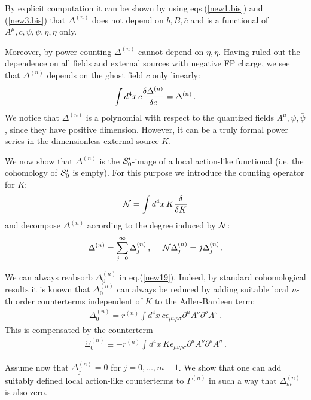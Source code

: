 \documentclass[a4paper,11pt]{article}
\def\G{\Gamma}
\begin{document}
By explicit computation it can be shown by using eqs.(\ref{new1.bis}) and
(\ref{new3.bis}) that $\Delta^{(n)}$ does not depend on $b,B,\bar c$ and
is a functional of $A^\mu,c,\bar \psi, \psi, \eta, \bar \eta$
only.

Moreover, by power counting $\Delta^{(n)}$ cannot depend on $\eta, \bar \eta$.
Having ruled out the dependence on all fields and external sources
with negative FP charge, we see that $\Delta^{(n)}$ depends on the
ghost field $c$ only linearly:
%
\begin{eqnarray}
\int d^4x \, c {\delta \Delta^{(n)} \over \delta c} = \Delta^{(n)} \, .
\label{new17}
\end{eqnarray}
%
We notice that $\Delta^{(n)}$ is a polynomial with respect
to the quantized fields $A^\mu, \psi, \bar \psi$, since they have
positive dimension. However, it can be a truly formal power series
in the dimensionless external source $K$.

We now show that $\Delta^{(n)}$ is 
the ${\cal S}'_0$-image of a local action-like functional
(i.e. the cohomology of ${\cal S}'_0$ is empty).
For this purpose we introduce the counting operator for $K$:
%
\begin{eqnarray}
{\cal N} = \int d^4x \, K {\delta \over \delta K}
\label{new18}
\end{eqnarray}
%
and decompose $\Delta^{(n)}$ according to the degree induced by ${\cal N}$:
%
\begin{eqnarray}
\Delta^{(n)}=\sum_{j=0}^\infty \Delta^{(n)}_j \, , ~~~~ {\cal N} \Delta^{(n)}_j = j \Delta^{(n)}_j \, .
\label{new19}
\end{eqnarray}
%


We can always reabsorb $\Delta^{(n)}_0$ in eq.(\ref{new19}). Indeed,
by standard cohomological results \cite{PS,anomalies} 
it is known that $\Delta^{(n)}_0$ can always be reduced  by adding suitable local $n$-th order
counterterms independent of $K$ to
the Adler-Bardeen term:
%
\begin{eqnarray}
\Delta^{(n)}_0 = r^{(n)}  \int d^4x \, c \epsilon_{\mu \nu \rho \sigma} \partial^\mu A^\nu
\partial^\rho A^\sigma \, .
\label{new20.bis}
\end{eqnarray}
%
This is compensated by the counterterm
%
\begin{eqnarray}
\Xi^{(n)}_0 \equiv - r^{(n)} \int d^4x \, K  \epsilon_{\mu \nu \rho \sigma} \partial^\mu A^\nu
\partial^\rho A^\sigma \, .
\label{new20.ter}
\end{eqnarray}
%

Assume now that $\Delta^{(n)}_j =0$ for $j=0,\dots,m-1$. We show that one can add suitably defined
local action-like counterterms to $\G^{(n)}$ in such a way that $\Delta^{(n)}_m$ is also zero.
\end{document}
